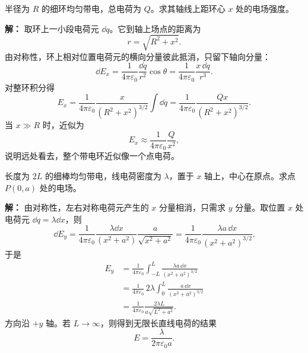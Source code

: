 \begin{example}[均匀带电细环轴线上一点的电场]
半径为 $R$ 的细环均匀带电，总电荷为 $Q$。求其轴线上距环心 $x$ 处的电场强度。

\textbf{解：} 取环上一小段电荷元 $\dd q$。它到轴上场点的距离为
\begin{equation}
r = \sqrt{R^2+x^2}.
\end{equation}
由对称性，环上相对位置电荷元的横向分量彼此抵消，只留下轴向分量：
\begin{equation}
\dd E_x = \frac{1}{4\pi\varepsilon_0}\frac{\dd q}{r^2}\cos\theta
= \frac{1}{4\pi\varepsilon_0}\frac{x\,\dd q}{r^3}.
\end{equation}
对整环积分得
\begin{equation}
E_x = \frac{1}{4\pi\varepsilon_0}\frac{x}{(R^2+x^2)^{3/2}}\int \dd q
= \frac{1}{4\pi\varepsilon_0}\frac{Qx}{(R^2+x^2)^{3/2}}.
\end{equation}
当 $x\gg R$ 时，近似为
\begin{equation}
E_x \approx \frac{1}{4\pi\varepsilon_0}\frac{Q}{x^2},
\end{equation}
说明远处看去，整个带电环近似像一个点电荷。
\end{example}

\begin{example}[有限长均匀带电直线在中垂线上一点的电场]
长度为 $2L$ 的细棒均匀带电，线电荷密度为 $\lambda$，置于 $x$ 轴上，中心在原点。求点 $P(0,a)$ 处的电场。

\textbf{解：} 由对称性，左右对称电荷元产生的 $x$ 分量相消，只需求 $y$ 分量。取位置 $x$ 处电荷元 $\dd q=\lambda\dd x$，则
\begin{equation}
\dd E_y = \frac{1}{4\pi\varepsilon_0}\frac{\lambda\dd x}{(x^2+a^2)}\frac{a}{\sqrt{x^2+a^2}}
= \frac{1}{4\pi\varepsilon_0}\frac{\lambda a\,\dd x}{(x^2+a^2)^{3/2}}.
\end{equation}
于是
\begin{align}
E_y &= \frac{1}{4\pi\varepsilon_0}\int_{-L}^{L}\frac{\lambda a\,\dd x}{(x^2+a^2)^{3/2}} \\
&= \frac{1}{4\pi\varepsilon_0}\,2\lambda\int_0^L \frac{a\,\dd x}{(x^2+a^2)^{3/2}} \\
&= \frac{1}{4\pi\varepsilon_0}\frac{2\lambda L}{a\sqrt{L^2+a^2}}.
\end{align}
方向沿 $+y$ 轴。若 $L\to \infty$，则得到无限长直线电荷的结果
\begin{equation}
E = \frac{\lambda}{2\pi\varepsilon_0 a}.
\end{equation}
\end{example}

